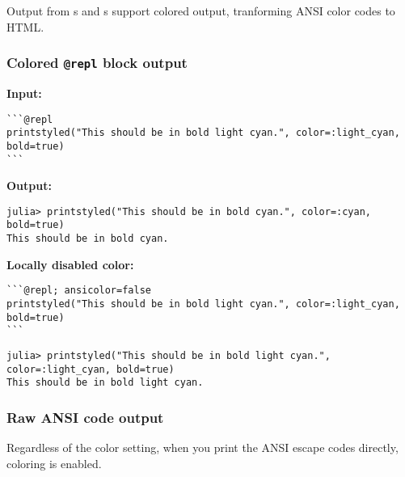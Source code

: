 Output from s and s support colored output, tranforming ANSI color codes to HTML.



\subsubsection{Colored \texttt{@repl} block output}



\label{681009610151884915}{}


\textbf{Input:}




\begin{lstlisting}
```@repl
printstyled("This should be in bold light cyan.", color=:light_cyan, bold=true)
```
\end{lstlisting}



\textbf{Output:}




\begin{verbatim}
julia> printstyled("This should be in bold cyan.", color=:cyan, bold=true)
This should be in bold cyan.
\end{verbatim}



\textbf{Locally disabled color:}




\begin{lstlisting}
```@repl; ansicolor=false
printstyled("This should be in bold light cyan.", color=:light_cyan, bold=true)
```
\end{lstlisting}




\begin{verbatim}
julia> printstyled("This should be in bold light cyan.", color=:light_cyan, bold=true)
This should be in bold light cyan.
\end{verbatim}



\subsubsection{Raw ANSI code output}



\label{13267379516757075300}{}


Regardless of the color setting, when you print the ANSI escape codes directly, coloring is enabled.





